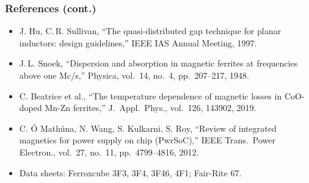 \begin{frame}
	\frametitle{References (cont.)}
	\scriptsize
	\begin{itemize}
		\item J. Hu, C.\,R. Sullivan, ``The quasi-distributed gap technique for planar inductors: design guidelines,'' IEEE IAS Annual Meeting, 1997.
		\item J.\,L. Snoek, ``Dispersion and absorption in magnetic ferrites at frequencies above one Mc/s,'' Physica, vol.\ 14, no.\ 4, pp.\ 207--217, 1948.
		\item C. Beatrice et al., ``The temperature dependence of magnetic losses in CoO-doped Mn-Zn ferrites,'' J.\ Appl.\ Phys., vol.\ 126, 143902, 2019.
		\item C. \'O Math\'una, N. Wang, S. Kulkarni, S. Roy, ``Review of integrated magnetics for power supply on chip (PwrSoC),'' IEEE Trans.\ Power Electron., vol.\ 27, no.\ 11, pp.\ 4799--4816, 2012.
		\item Data sheets: Ferroxcube 3F3, 3F4, 3F46, 4F1; Fair-Rite 67.
	\end{itemize}
\end{frame}
